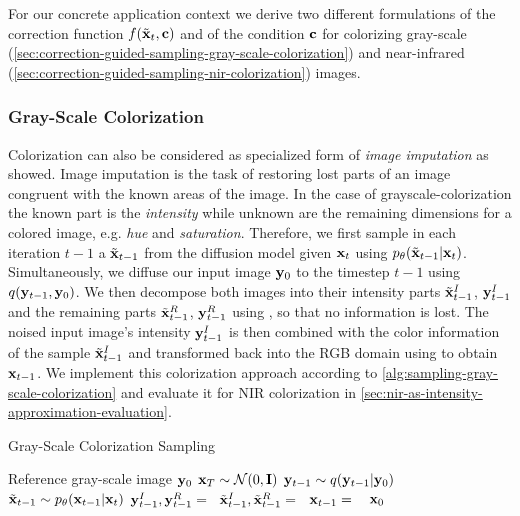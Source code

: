 For our concrete application context we derive two different formulations of the correction function $f(\tilde{\mathbf{x}}_t, \mathbf{c})$ and of the condition $\mathbf{c}$ 
for colorizing gray-scale (\autoref{sec:correction-guided-sampling-gray-scale-colorization}) and near-infrared (\autoref{sec:correction-guided-sampling-nir-colorization}) images. 

\subsubsection{Gray-Scale Colorization}
\label{sec:correction-guided-sampling-gray-scale-colorization}

Colorization can also be considered as specialized form of \textit{image imputation} as \textcite{sbgm} showed.
Image imputation is the task of restoring lost parts of an image congruent with the known areas of the image.
In the case of grayscale-colorization the known part is the \textit{intensity} while unknown are the remaining dimensions for a colored image, e.g. \textit{hue} and \textit{saturation}.
Therefore, we first sample in each iteration $t-1$ a $\tilde{\mathbf{x}}_{t-1}$ from the diffusion model given $\mathbf{x}_t$ using $p_\theta(\tilde{\mathbf{x}}_{t-1}|\mathbf{x}_t)$.
Simultaneously, we diffuse our input image $\mathbf{y}_0$ to the timestep $t-1$ using $q(\mathbf{y}_{t-1}, \mathbf{y}_0)$.
We then decompose both images into their intensity parts $\tilde{\mathbf{x}}_{t-1}^I$, $\mathbf{y}_{t-1}^I$ and the remaining parts $\tilde{\mathbf{x}}_{t-1}^R$, $\mathbf{y}_{t-1}^R$ using , so that no information is lost.
The noised input image's intensity $\mathbf{y}_{t-1}^I$ is then combined with the color information of the sample $\tilde{\mathbf{x}}_{t-1}^I$ and transformed back into the RGB domain using  to obtain $\mathbf{x}_{t-1}$.
We implement this colorization approach according to \autoref{alg:sampling-gray-scale-colorization} and evaluate it for NIR colorization in \autoref{sec:nir-as-intensity-approximation-evaluation}.

\begin{algorithm}[htp!]
   \caption{Gray-Scale Colorization Sampling}
   \label{alg:sampling-gray-scale-colorization}
   \begin{algorithmic}
      \Require Reference gray-scale image $\mathbf{y}_0$
      \State $\mathbf{x}_T \sim \mathcal{N}(0, \mathbf{I})$
      \State $\mathbf{y}_{t-1} \sim q(\mathbf{y}_{t-1}| \mathbf{y}_0)$
      \State $\tilde{\mathbf{x}}_{t-1} \sim p_\theta(\mathbf{x}_{t-1}|\mathbf{x}_t)$
      \State $\mathbf{y}_{t-1}^I, \mathbf{y}_{t-1}^R = $\ 
      \State $\tilde{\mathbf{x}}_{t-1}^I, \tilde{\mathbf{x}}_{t-1}^R=$\ 
      \State $\mathbf{x}_{t-1}=$ \ 
      \EndFor
      \Return $\mathbf{x}_0$
   \end{algorithmic}
\end{algorithm}

